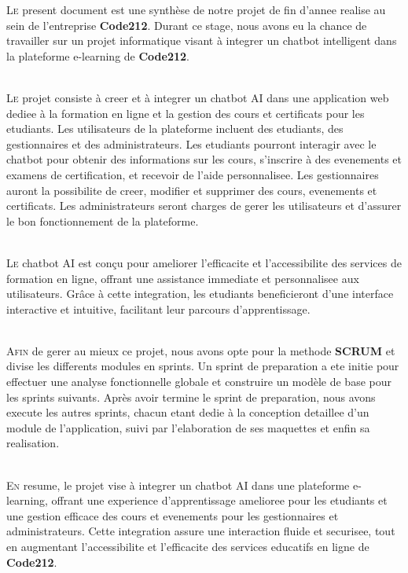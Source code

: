
\lettrine[nindent=0em, slope=-.5em] {\color{Eblue}L}{e} present document est une synthèse de notre projet de fin d'annee realise au sein de l'entreprise \textbf{Code212}. Durant ce stage, nous avons eu la chance de travailler sur un projet informatique visant à integrer un chatbot intelligent dans la plateforme e-learning de \textbf{Code212}.

\ \\

\lettrine[nindent=0em, slope=-.5em] {\color{Eblue}L}{e} projet consiste à creer et à integrer un chatbot AI dans une application web dediee à la formation en ligne et la gestion des cours et certificats pour les etudiants. Les utilisateurs de la plateforme incluent des etudiants, des gestionnaires et des administrateurs. Les etudiants pourront interagir avec le chatbot pour obtenir des informations sur les cours, s'inscrire à des evenements et examens de certification, et recevoir de l'aide personnalisee. Les gestionnaires auront la possibilite de creer, modifier et supprimer des cours, evenements et certificats. Les administrateurs seront charges de gerer les utilisateurs et d'assurer le bon fonctionnement de la plateforme.

\ \\

\lettrine[nindent=0em, slope=-.5em] {\color{Eblue}L}{e} chatbot AI est conçu pour ameliorer l'efficacite et l'accessibilite des services de formation en ligne, offrant une assistance immediate et personnalisee aux utilisateurs. Grâce à cette integration, les etudiants beneficieront d'une interface interactive et intuitive, facilitant leur parcours d'apprentissage.

\ \\

\lettrine[nindent=0em, slope=-.5em] {\color{Eblue}A}{fin} de gerer au mieux ce projet, nous avons opte pour la methode \textbf{SCRUM} et divise les differents modules en sprints. Un sprint de preparation a ete initie pour effectuer une analyse fonctionnelle globale et construire un modèle de base pour les sprints suivants. Après avoir termine le sprint de preparation, nous avons execute les autres sprints, chacun etant dedie à la conception detaillee d'un module de l'application, suivi par l'elaboration de ses maquettes et enfin sa realisation.

\ \\

\lettrine[nindent=0em, slope=-.5em] {\color{Eblue}E}{n} resume, le projet vise à integrer un chatbot AI dans une plateforme e-learning, offrant une experience d'apprentissage amelioree pour les etudiants et une gestion efficace des cours et evenements pour les gestionnaires et administrateurs. Cette integration assure une interaction fluide et securisee, tout en augmentant l'accessibilite et l'efficacite des services educatifs en ligne de \textbf{Code212}.
